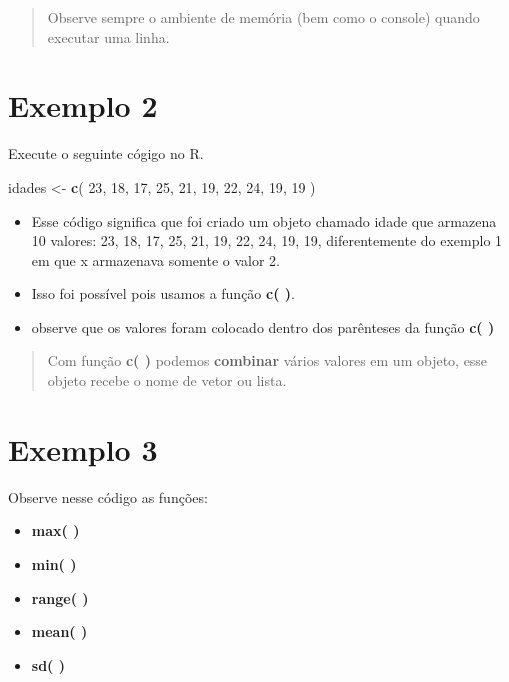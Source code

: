\documentclass[
]{book}
\newenvironment{Shaded}{\begin{snugshade}}{\end{snugshade}}
\newcommand{\DecValTok}[1]{\textcolor[rgb]{0.00,0.00,0.81}{#1}}
\newcommand{\FunctionTok}[1]{\textcolor[rgb]{0.13,0.29,0.53}{\textbf{#1}}}
\newcommand{\NormalTok}[1]{#1}
\newcommand{\OtherTok}[1]{\textcolor[rgb]{0.56,0.35,0.01}{#1}}
\begin{document}
\begin{quote}
Observe sempre o ambiente de memória (bem como o console) quando executar uma linha.
\end{quote}

\section{Exemplo 2}\label{exemplo-2}

Execute o seguinte cógigo no R.

\begin{Shaded}
\begin{Highlighting}[]
\NormalTok{idades }\OtherTok{\textless{}{-}} \FunctionTok{c}\NormalTok{( }\DecValTok{23}\NormalTok{, }\DecValTok{18}\NormalTok{, }\DecValTok{17}\NormalTok{, }\DecValTok{25}\NormalTok{, }\DecValTok{21}\NormalTok{, }\DecValTok{19}\NormalTok{, }\DecValTok{22}\NormalTok{, }\DecValTok{24}\NormalTok{, }\DecValTok{19}\NormalTok{, }\DecValTok{19}\NormalTok{ )}
\end{Highlighting}
\end{Shaded}

\begin{itemize}
\item
  Esse código significa que foi criado um objeto chamado idade que armazena 10 valores: 23, 18, 17, 25, 21, 19, 22, 24, 19, 19, diferentemente do exemplo 1 em que x armazenava somente o valor 2.
\item
  Isso foi possível pois usamos a função \textbf{c( )}.
\item
  observe que os valores foram colocado dentro dos parênteses da função \textbf{c( )}
\end{itemize}

\begin{quote}
Com função \textbf{c( )} podemos \textbf{combinar} vários valores em um objeto, esse objeto recebe o nome de vetor ou lista.
\end{quote}

\section{Exemplo 3}\label{exemplo-3}

Observe nesse código as funções:

\begin{itemize}
\item
  \textbf{max( )}
\item
  \textbf{min( )}
\item
  \textbf{range( )}
\item
  \textbf{mean( )}
\item
  \textbf{sd( )}
\end{itemize}
\end{document}
